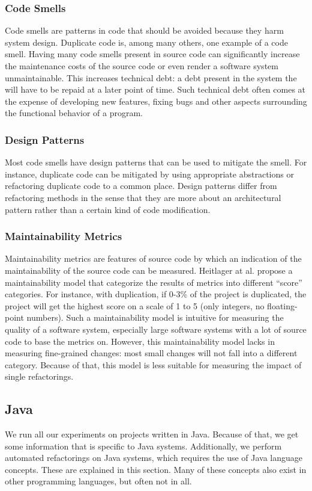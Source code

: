 \subsubsection{Code Smells}
Code smells are patterns in code that should be avoided because they harm system design. Duplicate code is, among many others, one example of a code smell. Having many code smells present in source code can significantly increase the maintenance costs of the source code or even render a software system unmaintainable. This increases technical debt: a debt present in the system the will have to be repaid at a later point of time. Such technical debt often comes at the expense of developing new features, fixing bugs and other aspects surrounding the functional behavior of a program.

\subsubsection{Design Patterns}
Most code smells have design patterns that can be used to mitigate the smell. For instance, duplicate code can be mitigated by using appropriate abstractions or refactoring duplicate code to a common place. Design patterns differ from refactoring methods in the sense that they are more about an architectural pattern rather than a certain kind of code modification.

\subsubsection{Maintainability Metrics}
Maintainability metrics are features of source code by which an indication of the maintainability of the source code can be measured. Heitlager at al. \cite{heitlager2007practical} propose a maintainability model that categorize the results of metrics into different ``score'' categories. For instance, with duplication, if 0-3\% of the project is duplicated, the project will get the highest score on a scale of 1 to 5 (only integers, no floating-point numbers). Such a maintainability model is intuitive for measuring the quality of a software system, especially large software systems with a lot of source code to base the metrics on. However, this maintainability model \cite{heitlager2007practical} lacks in measuring fine-grained changes: most small changes will not fall into a different category. Because of that, this model is less suitable for measuring the impact of single refactorings.

\subsection{Java}
We run all our experiments on projects written in Java. Because of that, we get some information that is specific to Java systems. Additionally, we perform automated refactorings on Java systems, which requires the use of Java language concepts. These are explained in this section. Many of these concepts also exist in other programming languages, but often not in all.

